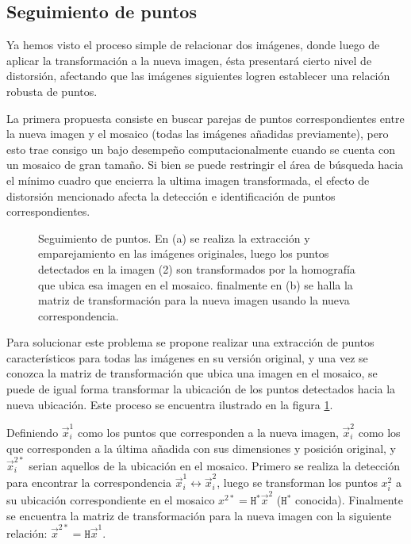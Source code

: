 \subsection{Seguimiento de puntos}\label{seguimiento-puntos}

Ya hemos visto el proceso simple de relacionar dos imágenes, donde luego de aplicar la transformación a la nueva imagen, ésta presentará cierto nivel de distorsión, afectando que las imágenes siguientes logren establecer una relación robusta de puntos.

La primera propuesta consiste en buscar parejas de puntos correspondientes entre la nueva imagen y el mosaico (todas las imágenes añadidas previamente), pero esto trae consigo un bajo desempeño computacionalmente cuando se cuenta con un mosaico de gran tamaño. Si bien se puede restringir el área de búsqueda hacia el mínimo cuadro que encierra la ultima imagen transformada, el efecto de distorsión mencionado afecta la detección e identificación de puntos correspondientes.

\begin{figure}[h]
	\centering     %
	
	
	\caption[Seguimiento de puntos]{Seguimiento de puntos. En (a) se realiza la extracción y emparejamiento en las imágenes originales, luego los puntos detectados en la imagen (2) son transformados por la homografía que ubica esa imagen en el mosaico. finalmente en (b) se halla la matriz de transformación para la nueva imagen usando la nueva correspondencia.}
	\label{imagen:track}
\end{figure}

Para solucionar este problema se propone realizar una extracción de puntos característicos para todas las imágenes en su versión original, y una vez se conozca la matriz de transformación que ubica una imagen en el mosaico, se puede de igual forma transformar la ubicación de los puntos detectados hacia la nueva ubicación. Este proceso se encuentra ilustrado en la figura \ref{imagen:track}.

Definiendo $\vec{x}^1_i$ como los puntos que corresponden a la nueva imagen, $\vec{x}^2_i$ como los que corresponden a la última añadida con sus dimensiones y posición original, y $\vec{x}^{2*}_i$ serian aquellos de la ubicación en el mosaico. Primero se realiza la detección para encontrar la correspondencia $\vec{x}^1_i \leftrightarrow \vec{x}^2_i$, luego se transforman los puntos $x^2_i$ a su ubicación correspondiente en el mosaico $x^{2*} = \mathtt{H}^*\vec{x}^2$ ($\mathtt{H}^*$ conocida). Finalmente se encuentra la matriz de transformación para la nueva imagen con la siguiente relación: $\vec{x}^{2*} = \mathtt{H}\vec{x}^1$.



